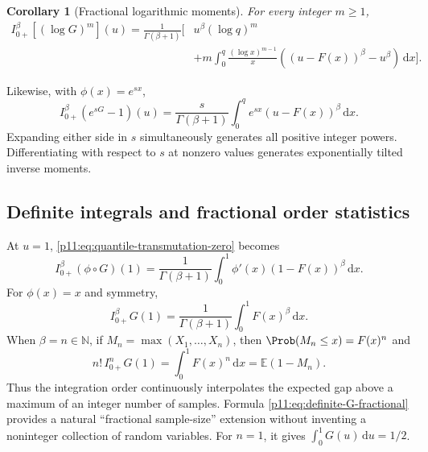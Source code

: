 \documentclass[11pt,oneside]{article}
\newtheorem{corollary}[theorem]{Corollary}
\theoremstyle{definition}
\theoremstyle{remark}
\newcommand{\E}{\mathbb E}
\newcommand{\N}{\mathbb N}
\newcommand{\dd}{\,\mathrm d}
\newcommand{\1}{\mathbf 1}
\begin{document}
\begin{corollary}[Fractional logarithmic moments]
For every integer $m\ge1$,
\begin{align}
 I_{0+}^{\beta}\!\left[(\log G)^m\right](u)
 =\frac1{\Gamma(\beta+1)}\Bigg[
 &u^\beta(\log q)^m\\
 &+m\int_0^q\frac{(\log x)^{m-1}}x
 \left((u-F(x))^\beta-u^\beta\right)\dd x
 \Bigg].
 \label{p11:eq:log-power-transmutation}
\end{align}
\end{corollary}

Likewise, with $\phi(x)=e^{sx}$,
\begin{equation}
 I_{0+}^{\beta}\!\left(e^{sG}-1\right)(u)
 =\frac{s}{\Gamma(\beta+1)}
  \int_0^q e^{sx}(u-F(x))^\beta\dd x.
 \label{p11:eq:exp-quantile-transmutation}
\end{equation}
Expanding either side in $s$ simultaneously generates all positive integer
powers.  Differentiating with respect to $s$ at nonzero values generates
exponentially tilted inverse moments.

\subsection{Definite integrals and fractional order statistics}

At $u=1$, \eqref{p11:eq:quantile-transmutation-zero} becomes
\begin{equation}
 I_{0+}^{\beta}(\phi\circ G)(1)
 =\frac1{\Gamma(\beta+1)}
  \int_0^1\phi'(x)(1-F(x))^\beta\dd x.
 \label{p11:eq:definite-quantile-general}
\end{equation}
For $\phi(x)=x$ and symmetry,
\begin{equation}
 I_{0+}^{\beta}G(1)
 =\frac1{\Gamma(\beta+1)}\int_0^1F(x)^\beta\dd x.
 \label{p11:eq:definite-G-fractional}
\end{equation}
When $\beta=n\in\N$, if $M_n=\max(X_1,\ldots,X_n)$, then
$\Prob(M_n\le x)=F(x)^n$ and
\begin{equation}
 n!\,I_{0+}^{n}G(1)
 =\int_0^1F(x)^n\dd x
 =\E(1-M_n).
 \label{p11:eq:order-statistic-interpretation}
\end{equation}
Thus the integration order continuously interpolates the expected gap above
a maximum of an integer number of samples.  Formula
\eqref{p11:eq:definite-G-fractional} provides a natural ``fractional sample-size''
extension without inventing a noninteger collection of random variables.
For $n=1$, it gives $\int_0^1G(u)\dd u=1/2$.
\end{document}
